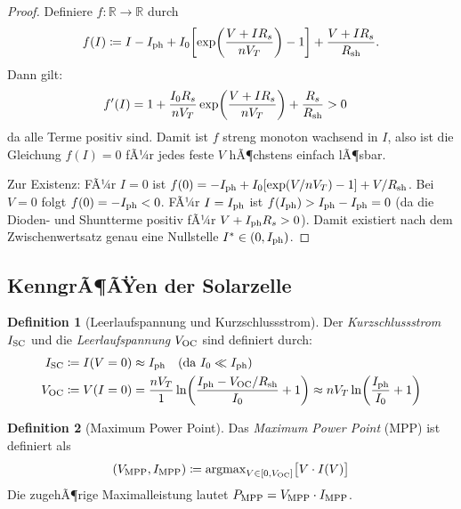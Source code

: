 ﻿\documentclass[a4paper,12pt]{article}
\theoremstyle{definition}
\newtheorem{definition}{Definition}[section]
\theoremstyle{remark}
\newcommand{\R}{\mathbb{R}}
\begin{document}
\begin{proof}
Definiere $f: \R \to \R$ durch
\begin{equation*}
  f(I) \coloneqq I - I_{\rm ph} + I_0\!\left[\exp\!\left(\frac{V + IR_s}{nV_T}\right) - 1\right]
  + \frac{V + IR_s}{R_{\rm sh}}.
\end{equation*}
Dann gilt:
\begin{align*}
  f'(I) &= 1 + \frac{I_0 R_s}{nV_T}\exp\!\left(\frac{V+IR_s}{nV_T}\right)
           + \frac{R_s}{R_{\rm sh}} > 0
\end{align*}
da alle Terme positiv sind. Damit ist $f$ streng monoton wachsend in $I$,
also ist die Gleichung $f(I) = 0$ fÃ¼r jedes feste $V$ hÃ¶chstens einfach lÃ¶sbar.

Zur Existenz: FÃ¼r $I = 0$ ist
$f(0) = -I_{\rm ph} + I_0[\exp(V/nV_T)-1] + V/R_{\rm sh}$.
Bei $V = 0$ folgt $f(0) = -I_{\rm ph} < 0$.
FÃ¼r $I = I_{\rm ph}$ ist
$f(I_{\rm ph}) > I_{\rm ph} - I_{\rm ph} = 0$ (da die Dioden- und
Shuntterme positiv fÃ¼r $V + I_{\rm ph} R_s > 0$).
Damit existiert nach dem Zwischenwertsatz genau eine Nullstelle
$I^* \in (0, I_{\rm ph})$.
\end{proof}

\subsection{KenngrÃ¶ÃŸen der Solarzelle}

\begin{definition}[Leerlaufspannung und Kurzschlussstrom]
Der \emph{Kurzschlussstrom} $I_{\rm SC}$ und die \emph{Leerlaufspannung}
$V_{\rm OC}$ sind definiert durch:
\begin{align}
  I_{\rm SC} &\coloneqq I(V=0) \approx I_{\rm ph}
    \quad\text{(da } I_0 \ll I_{\rm ph}\text{)} \label{eq:isc}\\
  V_{\rm OC} &\coloneqq V(I=0) = \frac{nV_T}{1}\ln\!\left(
    \frac{I_{\rm ph} - V_{\rm OC}/R_{\rm sh}}{I_0} + 1\right)
    \approx nV_T \ln\!\left(\frac{I_{\rm ph}}{I_0}+1\right) \label{eq:voc}
\end{align}
\end{definition}

\begin{definition}[Maximum Power Point]
\label{def:mpp}
Das \emph{Maximum Power Point} (MPP) ist definiert als
\begin{equation}
  (V_{\rm MPP}, I_{\rm MPP}) \coloneqq \operatorname{argmax}_{V \in [0, V_{\rm OC}]}
    \bigl[V \cdot I(V)\bigr]
  \label{eq:mpp_def}
\end{equation}
Die zugehÃ¶rige Maximalleistung lautet $P_{\rm MPP} = V_{\rm MPP} \cdot I_{\rm MPP}$.
\end{definition}
\end{document}
